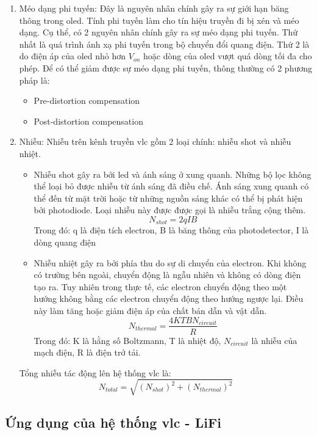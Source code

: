 \begin{enumerate}
	\item Méo dạng phi tuyến:
	Đây là nguyên nhân chính gây ra sự giới hạn băng thông trong \ac{oled}. Tính phi tuyến làm cho tín hiệu truyền đi bị xén và méo dạng. Cụ thể, có 2 nguyên nhân chính gây ra sự méo dạng phi tuyến. Thứ nhất là quá trình ánh xạ phi tuyến trong bộ chuyển đổi quang điện. Thứ 2 là do điện áp của \ac{oled} nhỏ hơn $V_{on}$ hoặc dòng của \ac{oled} vượt quá dòng tối đa cho phép. Để có thể giảm được sự méo dạng phi tuyến, thông thường có 2 phương 		pháp là:
	\begin{itemize}
		\item Pre-distortion compensation
		\item Post-distortion compensation
	\end{itemize}
	\item Nhiễu: \cite{noise-in-vlc}
	Nhiễu trên kênh truyền \ac{vlc} gồm 2 loại chính: nhiễu shot và nhiễu nhiệt. 
	\begin{itemize}
		\item Nhiễu shot gây ra bởi \ac{led} và ánh sáng ở xung quanh. Những bộ lọc không thể loại bỏ được nhiễu từ ánh sáng đã điều chế. Ánh sáng xung quanh có thể đến từ mặt trời hoặc từ những nguồn sáng khác có thể bị 			phát hiện bởi photodiode. Loại nhiễu này được được gọi là nhiễu trắng cộng thêm.
		\begin{equation}
		N_{shot} = 2qIB
		\end{equation}
		Trong đó: q là điện tích electron, B là băng thông của photodetector, I là dòng quang điện
		\item Nhiễu nhiệt gây ra bởi phía thu do sự di chuyển của electron. Khi không có trường bên ngoài, chuyển động là ngẫu nhiên và không có dòng điện tạo ra. Tuy nhiên trong thực tế, các electron chuyển động theo một hướng không bằng các electron chuyển động theo hướng ngược lại. Điều này làm tăng hoặc giảm điện áp của chất bán dẫn và vật dẫn.
		\begin{equation}
		N_{thermal} = \frac {4KTBN_{circuit}}{R}
		\end{equation}
		Trong đó: K là hằng số Boltzmann, T là nhiệt độ, $N_{circuit}$ là nhiễu của mạch điện, R là điện trở tải.
	\end{itemize}
	Tổng nhiễu tác động lên hệ thống \ac{vlc} là:
	\begin{equation}
	N_{total} = \sqrt{(N_{shot})^2 + (N_{thermal})^2}
	\end{equation}
\end{enumerate}
\subsection{Ứng dụng của hệ thống \ac{vlc} - LiFi  \cite{VLC-application}}


